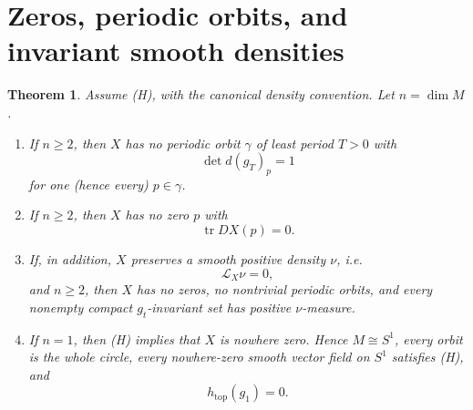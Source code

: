 \documentclass[12pt]{article}
\newtheorem{theorem}{Theorem}[section]
\theoremstyle{definition}
\DeclareMathOperator{\tr}{tr}
\begin{document}
\section{Zeros, periodic orbits, and invariant smooth densities}
\label{sec:zeros}

\begin{theorem}\label{thm:exclusions}
Assume (H), with the canonical density convention.  Let \(n=\dim M\).
\begin{enumerate}
\item If \(n\ge 2\), then \(X\) has no periodic orbit \(\gamma\) of least period \(T>0\) with
\[
\det d(g_T)_p=1
\]
for one (hence every) \(p\in\gamma\).
\item If \(n\ge 2\), then \(X\) has no zero \(p\) with
\[
\tr DX(p)=0.
\]
\item If, in addition, \(X\) preserves a smooth positive density \(\nu\), i.e.
\[
\mathcal L_X\nu=0,
\]
and \(n\ge 2\), then \(X\) has no zeros, no nontrivial periodic orbits, and every nonempty compact \(g_t\)-invariant set has positive \(\nu\)-measure.
\item If \(n=1\), then (H) implies that \(X\) is nowhere zero.  Hence \(M\cong S^1\), every orbit is the whole circle, every nowhere-zero smooth vector field on \(S^1\) satisfies (H), and
\[
h_{\mathrm{top}}(g_1)=0.
\]
\end{enumerate}
\end{theorem}
\end{document}
